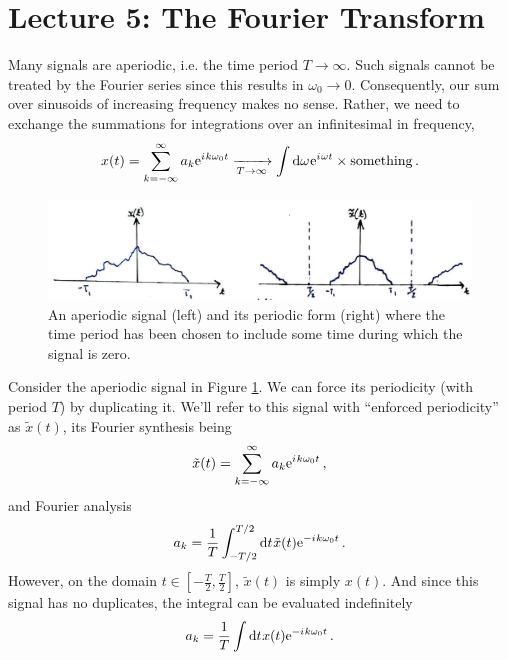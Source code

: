 \section{Lecture 5: The Fourier Transform}

Many signals are aperiodic, i.e. the time period $T \rightarrow\infty$. Such
signals cannot be treated by the Fourier series since this results in
$\omega_0\rightarrow 0$. Consequently, our sum over sinusoids of increasing
frequency makes no sense. Rather, we need to exchange the summations for
integrations over an infinitesimal in frequency,
%
\begin{displaymath}
  x(t) = \sum_{k=-\infty}^\infty a_k\mathrm{e}^{{i\mkern1mu} k\omega_0 t} \xrightarrow[T\rightarrow\infty]{}
  \int\mathrm{d}\omega\mkern1mu \mathrm{e}^{{i\mkern1mu}\omega t} \times \mathrm{something} \,.
\end{displaymath}
%
\begin{figure}[H]
  \includegraphics[width=\textwidth]{images/lecture_5_enforce_periodicity.JPG}
  \caption{
    An aperiodic signal (left) and its periodic form (right) where the time period
    has been chosen to include some time during which the signal is zero.
  }
  \label{fig::lecture_5_enforce_periodicity}
\end{figure}
%
Consider the aperiodic signal in Figure \ref{fig::lecture_5_enforce_periodicity}. We can force its periodicity (with
period $T$) by duplicating it. We'll refer to this
signal with ``enforced periodicity'' as $\tilde{x}(t)$, its Fourier synthesis
being
%
\begin{displaymath}
  \tilde{x}(t) = \sum_{k=-\infty}^\infty a_k\mathrm{e}^{{i\mkern1mu} k\omega_0 t} \,,
\end{displaymath}
%
and Fourier analysis
%
\begin{displaymath}
  a_k = \frac{1}{T}\int_{-T/2}^{T/2} \mathrm{d}t\mkern1mu \tilde{x}(t)\mathrm{e}^{-{i\mkern1mu} k\omega_0 t} \,.
\end{displaymath}
%
However, on the domain $t\in[-\frac{T}{2},\frac{T}{2}]$, $\tilde{x}(t)$ is simply $x(t)$.
And since this signal has no duplicates, the integral can be evaluated indefinitely
%
\begin{displaymath}
  a_k = \frac{1}{T}\int \mathrm{d}t\mkern1mu x(t)\mathrm{e}^{-{i\mkern1mu} k\omega_0 t} \,.
\end{displaymath}
